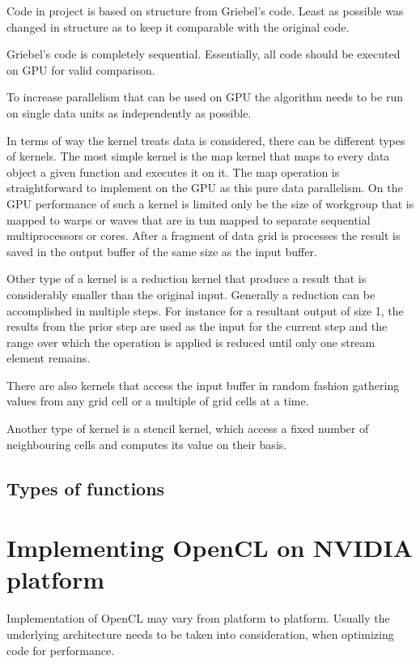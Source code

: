 Code in project is based on structure from Griebel's code. Least as possible was changed in structure as to keep it comparable with the original code.


Griebel's code is completely sequential. Essentially, all code should be executed on GPU for valid comparison. 

To increase parallelism that can be used on GPU the algorithm needs to be run on single data units as independently as possible.

In terms of way the kernel treats data is considered, there can be different types of kernels. The most simple kernel is the map kernel that maps to every data object a given function and executes it on it. The map operation is straightforward to implement on the GPU as this pure data parallelism. On the GPU performance of such a kernel is limited only be the size of workgroup that is mapped to warps or waves that are in tun mapped to separate sequential multiprocessors or cores. After a fragment of data grid is processes the result is saved in the output buffer of the same size as the input buffer.

Other type of a kernel is a reduction kernel that produce a result that is considerably smaller than the original input. Generally a reduction can be accomplished in multiple steps. For instance for a resultant output of size 1, the results from the prior step are used as the input for the current step and the range over which the operation is applied is reduced until only one stream element remains.

There are also kernels that access the input buffer in random fashion gathering values from any grid cell or a multiple of grid cells at a time.

Another type of kernel is a stencil kernel, which access a fixed number of neighbouring cells and computes its value on their basis.

\subsection{Types of functions}

\section{Implementing OpenCL on NVIDIA platform}
Implementation of OpenCL may vary from platform to platform. Usually the underlying architecture needs to be taken into consideration, when optimizing code for performance.

